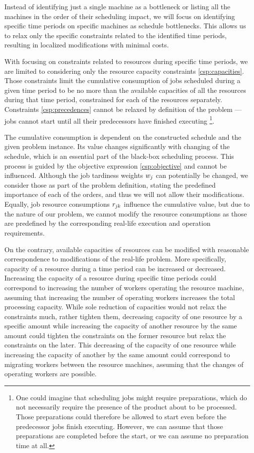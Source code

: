 Instead of identifying just a single machine as a bottleneck
or listing all the machines in the order of their scheduling impact,
we will focus on identifying specific time periods on specific machines as schedule bottlenecks.
This allows us to relax only the specific constraints related to the identified time periods,
resulting in localized modifications with minimal costs.

With focusing on constraints related to resources during specific time periods,
we are limited to considering only the resource capacity constraints \eqref{csp:capacities}.
Those constraints limit the cumulative consumption of jobs scheduled during a given time period
to be no more than the available capacities of all the resources during that time period,
constrained for each of the resources separately.
Constraints \eqref{csp:precedences} cannot be relaxed by definition of the problem
--- jobs cannot start until all their predecessors have finished executing%
\footnote{One could imagine that scheduling jobs might require preparations,
which do not necessarily require the presence of the product about to be processed.
Those preparations could therefore be allowed to start even before the predecessor jobs finish executing.
However, we can assume that those preparations are completed before the start,
or we can assume no preparation time at all.}.

The cumulative consumption is dependent on the constructed schedule and the given problem instance.
Its value changes significantly with changing of the schedule,
which is an essential part of the black-box scheduling process.
This process is guided by the objective expression \eqref{csp:objective} and cannot be influenced.
Although the job tardiness weights $w_{j}$ can potentially be changed,
we consider those as part of the problem definition,
stating the predefined importance of each of the orders,
and thus we will not allow their modifications.
Equally, job resource consumptions $r_{j k}$ influence the cumulative value,
but due to the nature of our problem,
we cannot modify the resource consumptions as those are predefined by the corresponding real-life
execution and operation requirements.

On the contrary, available capacities of resources can be modified with reasonable correspondence
to modifications of the real-life problem.
More specifically, capacity of a resource during a time period can be increased or decreased.
Increasing the capacity of a resource during specific time periods could correspond to increasing
the number of workers operating the resource machine,
assuming that increasing the number of operating workers increases the total processing capacity.
While sole reduction of capacities would not relax the constraints much, rather tighten them,
decreasing capacity of one resource by a specific amount while increasing the capacity of another resource
by the same amount could tighten the constraints on the former resource but relax the constraints on the later.
This decreasing of the capacity of one resource while increasing the capacity of another by the same amount
could correspond to migrating workers between the resource machines,
assuming that the changes of operating workers are possible.

